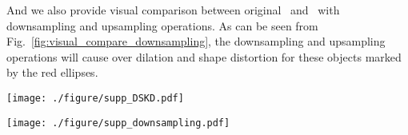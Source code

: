 \documentclass[10pt,twocolumn,letterpaper]{article}
\begin{document}
And we also provide visual comparison between original \algorithmname~and \algorithmname~with downsampling and upsampling operations. As can be seen from Fig.~\ref{fig:visual_compare_downsampling}, the downsampling and upsampling operations will cause over dilation and shape distortion for these objects marked by the red ellipses. 


\begin{figure*}[t]
 \centering
 \texttt{[image: ./figure/supp\_DSKD.pdf]}
 \vskip -0.3cm
 \caption{Visual comparison of \algorithmname~with and without DSKD on the SemanticKITTI~\cite{behley2019semantickitti} validation set. From left to right: \algorithmname~without the DSKD loss, \algorithmname~with DSKD, \algorithmname-4Frames and ground-truth. Different color represents different class.}
 \centering
 \vskip -0.1cm
 \label{fig:visual_compare_dskd}
\end{figure*}


\begin{figure*}[t]
 \centering
 \texttt{[image: ./figure/supp\_downsampling.pdf]}
 \vskip -0.1cm
 \caption{Visual comparison of \algorithmname~with and without the downsampling operation on the SemanticKITTI~\cite{behley2019semantickitti} validation set. From left to right: \algorithmname~with downsampling operation, \algorithmname~without downsampling operation, \algorithmname-4Frames and ground-truth. Different color represents different class.}
 \centering
 \vskip -0.1cm
 \label{fig:visual_compare_downsampling}
\end{figure*}
\end{document}
